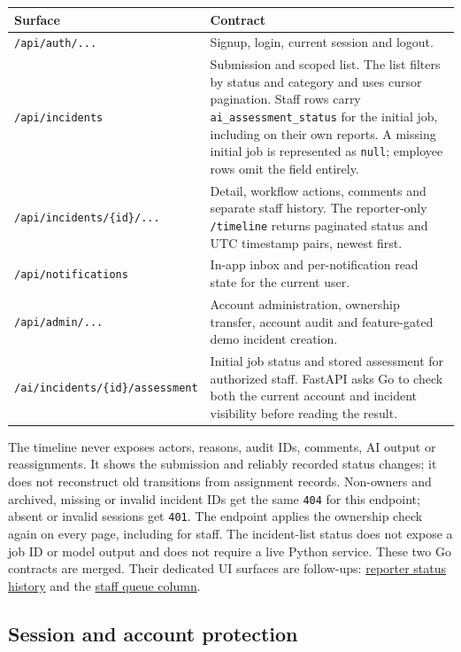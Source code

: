 \documentclass[11pt,a4paper]{article}
\newcommand{\project}{https://github.com/bekadoux/cyberguard}
\newcommand{\code}[1]{\texttt{#1}}
\newcommand{\route}[1]{\nolinkurl{#1}}
\begin{document}
\begin{center}
\begin{tabularx}{\linewidth}{@{}lY@{}}
\toprule
\textbf{Surface} & \textbf{Contract} \\
\midrule
\route{/api/auth/...} & Signup, login, current session and logout. \\
\addlinespace
\route{/api/incidents} & Submission and scoped list. The list filters by
status and category and uses cursor pagination. Staff rows carry
\route{ai_assessment_status} for the initial job, including on their own
reports. A missing initial job is represented as \code{null}; employee
rows omit the field entirely. \\
\addlinespace
\route{/api/incidents/{id}/...} & Detail, workflow actions, comments and
separate staff history. The reporter-only \route{/timeline} returns paginated
status and UTC timestamp pairs, newest first. \\
\addlinespace
\route{/api/notifications} & In-app inbox and per-notification read state
for the current user. \\
\addlinespace
\route{/api/admin/...} & Account administration, ownership transfer,
account audit and feature-gated demo incident creation. \\
\addlinespace
\route{/ai/incidents/{id}/assessment} & Initial job status and stored
assessment for authorized staff. FastAPI asks Go to check both the current
account and incident visibility before reading the result. \\
\bottomrule
\end{tabularx}
\end{center}

The timeline never exposes actors, reasons, audit IDs, comments, AI output or
reassignments. It shows the submission and reliably recorded status changes;
it does not reconstruct old transitions from assignment records. Non-owners
and archived, missing or invalid incident IDs get the same \code{404} for
this endpoint; absent or invalid sessions get \code{401}. The endpoint
applies the ownership check again on every page, including for staff.
The incident-list status does not expose a job ID or model output and does
not require a live Python service. These two Go contracts are merged. Their
dedicated UI surfaces are follow-ups: \href{\project/issues/16}{reporter
status history} and the \href{\project/issues/17}{staff queue column}.

\subsection{Session and account protection}
\end{document}
